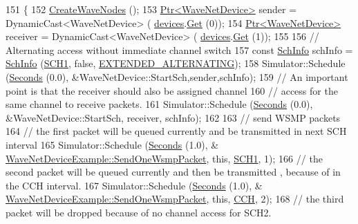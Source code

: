 \begin{DoxyCode}
151 \{
152   \hyperlink{classWaveNetDeviceExample_a825285810121c865230f6fafe6428081}{CreateWaveNodes} ();
153   \hyperlink{classns3_1_1Ptr}{Ptr<WaveNetDevice>}  sender = DynamicCast<WaveNetDevice> (
      \hyperlink{classWaveNetDeviceExample_a4b88c787809e6171c04eba282d1a1715}{devices}.\hyperlink{classns3_1_1NetDeviceContainer_a677d62594b5c9d2dea155cc5045f4d0b}{Get} (0));
154   \hyperlink{classns3_1_1Ptr}{Ptr<WaveNetDevice>}  receiver = DynamicCast<WaveNetDevice> (
      \hyperlink{classWaveNetDeviceExample_a4b88c787809e6171c04eba282d1a1715}{devices}.\hyperlink{classns3_1_1NetDeviceContainer_a677d62594b5c9d2dea155cc5045f4d0b}{Get} (1));
155 
156   \textcolor{comment}{// Alternating access without immediate channel switch}
157   \textcolor{keyword}{const} \hyperlink{structns3_1_1SchInfo}{SchInfo} schInfo = \hyperlink{structns3_1_1SchInfo}{SchInfo} (\hyperlink{channel-manager_8h_a456a1b730523e5d3b8a29fb227d10028}{SCH1}, \textcolor{keyword}{false}, 
      \hyperlink{channel-scheduler_8h_a0e1f74c3cb8f78904dd1ae957412392e}{EXTENDED\_ALTERNATING});
158   Simulator::Schedule (\hyperlink{group__timecivil_ga33c34b816f8ff6628e33d5c8e9713b9e}{Seconds} (0.0), &WaveNetDevice::StartSch,sender,schInfo);
159   \textcolor{comment}{// An important point is that the receiver should also be assigned channel}
160   \textcolor{comment}{// access for the same channel to receive packets.}
161   Simulator::Schedule (\hyperlink{group__timecivil_ga33c34b816f8ff6628e33d5c8e9713b9e}{Seconds} (0.0), &WaveNetDevice::StartSch, receiver, schInfo);
162 
163   \textcolor{comment}{// send WSMP packets}
164   \textcolor{comment}{// the first packet will be queued currently and be transmitted in next SCH interval}
165   Simulator::Schedule (\hyperlink{group__timecivil_ga33c34b816f8ff6628e33d5c8e9713b9e}{Seconds} (1.0), &
      \hyperlink{classWaveNetDeviceExample_a2dc13b30baad7f9e0a3f23d3dc60557c}{WaveNetDeviceExample::SendOneWsmpPacket},  \textcolor{keyword}{this}, 
      \hyperlink{channel-manager_8h_a456a1b730523e5d3b8a29fb227d10028}{SCH1}, 1);
166   \textcolor{comment}{// the second packet will be queued currently and then be transmitted , because of in the CCH interval.}
167   Simulator::Schedule (\hyperlink{group__timecivil_ga33c34b816f8ff6628e33d5c8e9713b9e}{Seconds} (1.0), &
      \hyperlink{classWaveNetDeviceExample_a2dc13b30baad7f9e0a3f23d3dc60557c}{WaveNetDeviceExample::SendOneWsmpPacket},  \textcolor{keyword}{this}, 
      \hyperlink{channel-manager_8h_a52d2f169cde2f6abe66ecc83f0d7ad80}{CCH}, 2);
168   \textcolor{comment}{// the third packet will be dropped because of no channel access for SCH2.}

\end{DoxyCode}
